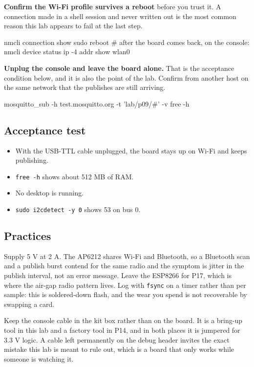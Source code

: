 \begin{steps}
\item \textbf{Confirm the Wi-Fi profile survives a reboot} before you trust it. A connection made in a shell session and never written out is the most common reason this lab appears to fail at the last step.
\begin{shellcode}
nmcli connection show
sudo reboot
# after the board comes back, on the console:
nmcli device status
ip -4 addr show wlan0
\end{shellcode}

\item \textbf{Unplug the console and leave the board alone.} That is the acceptance condition below, and it is also the point of the lab. Confirm from another host on the same network that the publishes are still arriving.
\begin{shellcode}
mosquitto_sub -h test.mosquitto.org -t 'lab/p09/#' -v
free -h
\end{shellcode}
\end{steps}

\subsection*{Acceptance test}

\begin{itemize}
\item With the USB-TTL cable unplugged, the board stays up on Wi-Fi and keeps publishing.
\item \texttt{free -h} shows about 512 MB of RAM.
\item No desktop is running.
\item \texttt{sudo i2cdetect -y 0} shows 53 on bus 0.
\end{itemize}

\subsection*{Practices}

Supply 5 V at 2 A. The AP6212 shares Wi-Fi and Bluetooth, so a Bluetooth scan and a publish burst contend for the same radio and the symptom is jitter in the publish interval, not an error message. Leave the ESP8266 for P17, which is where the air-gap radio pattern lives. Log with \texttt{fsync} on a timer rather than per sample: this is soldered-down flash, and the wear you spend is not recoverable by swapping a card.

Keep the console cable in the kit box rather than on the board. It is a bring-up tool in this lab and a factory tool in P14, and in both places it is jumpered for 3.3 V logic. A cable left permanently on the debug header invites the exact mistake this lab is meant to rule out, which is a board that only works while someone is watching it.

